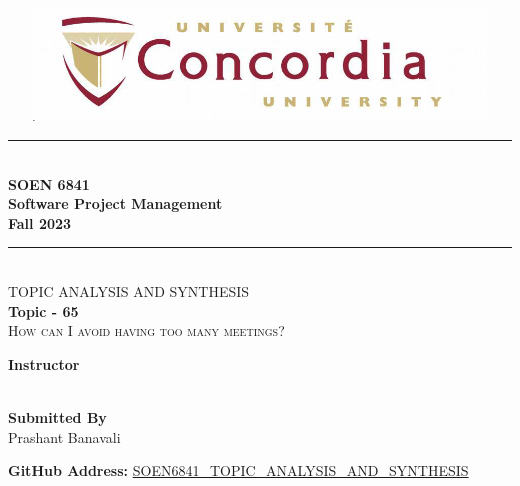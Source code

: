 \addtolength{\topmargin}{2in}
\begin{titlepage} 
\newcommand{\HRule}{\rule{\linewidth}{0.5mm}} %
\center %
\includegraphics[width=150mm,height=30mm,scale=0.5]{TAS/Images/ConcordiaLogo.png} 
\HRule\\[1.0cm]

{\huge\bfseries  SOEN 6841 }\\[0.7cm]
{\huge\bfseries Software Project Management}\\[0.5cm] %
{\huge\bfseries Fall 2023}\\[0.4cm] %
\HRule\\[1.5cm]
\textsc{\Large TOPIC ANALYSIS AND SYNTHESIS}\\[0.5cm] 
\huge
\textbf{Topic - 65}\\
\textsc{How can I avoid having too many meetings?}\\[1cm]
\large
\vfill\vfill\vfill\vfill
\begin{center}
\textbf{Instructor}\\
\\[1cm]
\end{center}
\large
\begin{center}
\textbf{Submitted By}\\
Prashant Banavali \\[1cm]
\end{center}

\textbf{GitHub Address:} \href{https://github.com/PrashantBanavali/SOEN6841_TOPIC_ANALYSIS_AND_SYNTHESIS}{SOEN6841\_TOPIC\_ANALYSIS\_AND\_SYNTHESIS}
\vfill %
\end{titlepage}